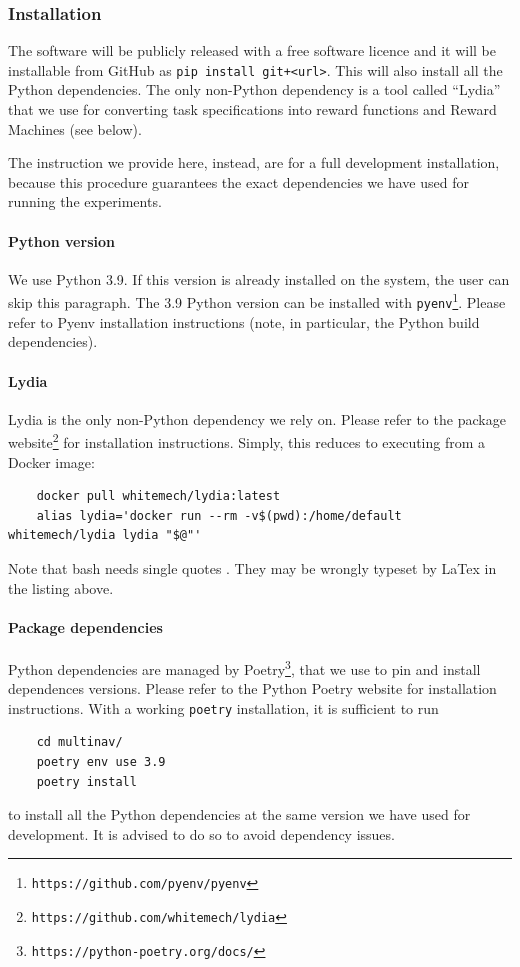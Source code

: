 \subsubsection*{Installation}
The software will be publicly released with a free software licence and it will be installable
from GitHub as \verb|pip install git+<url>|.
This will also install all the Python dependencies.
The only non-Python dependency is a tool called
``Lydia'' that we use for converting task specifications into reward functions
and Reward Machines (see below).

The instruction we provide here, instead, are for a full development installation,
because this procedure guarantees the exact dependencies we have used for
running the experiments.

\paragraph{Python version}
We use Python 3.9. If this version is already installed on the system, the user can skip this paragraph.
The 3.9 Python version can be installed with \texttt{pyenv}\footnote{\texttt{https://github.com/pyenv/pyenv}}.
Please refer to Pyenv installation instructions (note, in particular, the Python build dependencies).

\paragraph{Lydia}
Lydia is the only non-Python dependency we rely on.
Please refer to the package website\footnote{\texttt{https://github.com/whitemech/lydia}}
for installation instructions.
Simply, this reduces to executing from a Docker image:
\begin{verbatim}
	docker pull whitemech/lydia:latest
	alias lydia='docker run --rm -v$(pwd):/home/default whitemech/lydia lydia "$@"'
\end{verbatim}
Note that bash needs single quotes \textquotesingle. They may be wrongly typeset by LaTex in the listing above.


\paragraph{Package dependencies}
Python dependencies are managed by Poetry\footnote{\texttt{https://python-poetry.org/docs/}},
that we use to pin and install dependences versions.
Please refer to the Python Poetry website for installation instructions.
With a working \texttt{poetry} installation, it is sufficient to run
\begin{verbatim}
	cd multinav/
	poetry env use 3.9
	poetry install
\end{verbatim}
to install all the Python dependencies at the same version we have used for development.
It is advised to do so to avoid dependency issues.

